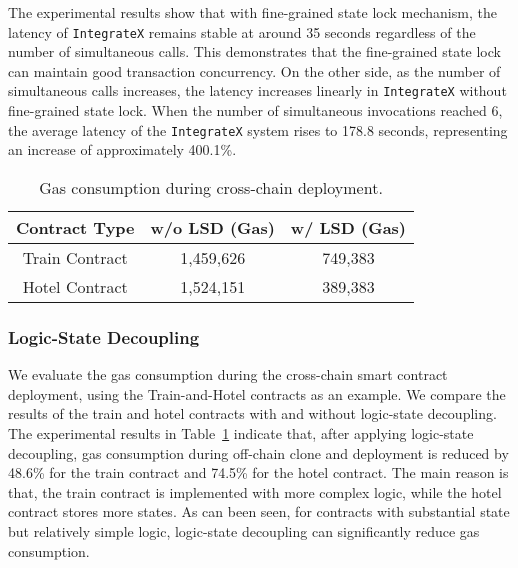 The experimental results show that with fine-grained state lock mechanism, the latency of \texttt{IntegrateX} remains stable at around 35 seconds regardless of the number of simultaneous calls.
This demonstrates that the fine-grained state lock can maintain good transaction concurrency.
On the other side, as the number of simultaneous calls increases, the latency increases linearly in \texttt{IntegrateX} without fine-grained state lock. 
When the number of simultaneous invocations reached 6, the average latency of the \texttt{IntegrateX} system rises to 178.8 seconds, representing an increase of approximately 400.1\%.



\begin{table}[tbh]
\centering
\caption{Gas consumption during cross-chain deployment.}
\begin{tabular}{|c|c|c|}
\hline
\textbf{  Contract Type  }  & \textbf{  w/o LSD 
(Gas)  } & \textbf{  w/ LSD (Gas)  } \\ \hline
Train Contract          & 1,459,626                                & 749,383                              \\ \hline
Hotel Contract          & 1,524,151                                & 389,383                              \\ \hline
\end{tabular}
\label{lsd}
\end{table}

\subsubsection{Logic-State Decoupling}
We evaluate the gas consumption during the cross-chain smart contract deployment, using the Train-and-Hotel contracts as an example.
We compare the results of the train and hotel contracts with and without logic-state decoupling.
The experimental results in Table~\ref{lsd} indicate that, after applying logic-state decoupling, gas consumption during off-chain clone and deployment is reduced by 48.6\% for the train contract and 74.5\% for the hotel contract. 
The main reason is that, the train contract is implemented with more complex logic, while the hotel contract stores more states. 
As can been seen, for contracts with substantial state but relatively simple logic, logic-state decoupling can significantly reduce gas consumption.

